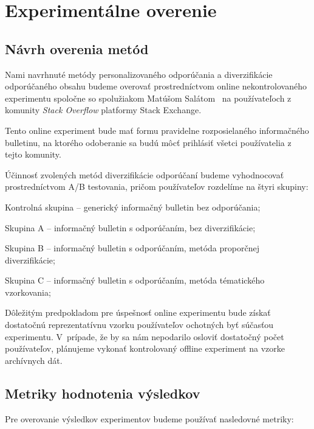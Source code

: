 \afterpage{\blankpage}
\newpage
\chapter{Experimentálne overenie}
\label{sec:experiment}

\section{Návrh overenia metód}

Nami navrhnuté metódy personalizovaného odporúčania a diverzifikácie odporúčaného obsahu budeme overovať prostredníctvom
online nekontrolovaného experimentu spoločne so spolužiakom Matúšom Salátom~\cite{Salat2018} na používateľoch z komunity \textit{Stack Overflow} platformy Stack Exchange.

Tento online experiment bude mať formu pravidelne rozposielaného informačného bulletinu, na ktorého odoberanie sa budú
môcť prihlásiť všetci používatelia z tejto komunity.

Účinnosť zvolených metód diverzifikácie odporúčaní budeme vyhodnocovať prostredníctvom A/B testovania, pričom používateľov
rozdelíme na štyri skupiny:
\begin{my_enumerate}
    \item{Kontrolná skupina -- generický informačný bulletin bez odporúčania;}
    \item{Skupina A -- informačný bulletin s odporúčaním, bez diverzifikácie;}
    \item{Skupina B -- informačný bulletin s odporúčaním, metóda proporčnej diverzifikácie;}
    \item{Skupina C -- informačný bulletin s odporúčaním, metóda tématického vzorkovania;}
\end{my_enumerate}

Dôležitým predpokladom pre úspešnosť online experimentu bude získať dostatočnú reprezentatívnu vzorku používateľov
ochotných byť súčasťou experimentu. V~prípade, že by sa nám nepodarilo osloviť dostatočný počet používateľov, plánujeme
vykonať kontrolovaný offline experiment na vzorke archívnych dát.


\section{Metriky hodnotenia výsledkov}

Pre overovanie výsledkov experimentov budeme používať nasledovné metriky:

